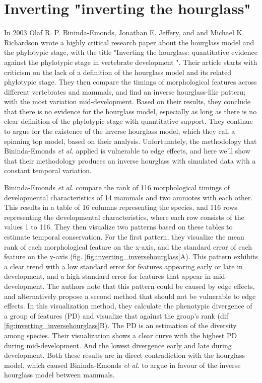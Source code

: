 \chapter{Inverting "inverting the hourglass"}\thumbforchapter
\newpage

In 2003 Olaf R. P. Bininda-Emonds, Jonathan E. Jeffery, and and Michael K. Richardson wrote a highly critical research paper about the hourglass model and the phylotypic stage, with the title "Inverting the hourglass: quantitative evidence against the phylotypic stage in vertebrate development "\cite{OlafRP2003}. Their article starts with criticism on the lack of a definition of the hourglass model and its related phylotypic stage. They then compare the timings of morphological features across different vertebrates and mammals, and find an inverse hourglass-like pattern; with the most variation mid-development. Based on their results, they conclude that there is no evidence for the hourglass model, especially as long as there is no clear definition of the phylotypic stage with quantitative support. They continue to argue for the existence of the inverse hourglass model, which they call a spinning top model, based on their analysis. Unfortunately, the methodology that Bininda-Emonds \textit{et al.} applied is vulnerable to edge effects, and here we'll show that their methodology produces an inverse hourglass with simulated data with a constant temporal variation.

Bininda-Emonds \textit{et al.} compare the rank of 116 morphological timings of developmental characteristics of 14 mammals and two amniotes with each other. This results in a table of 16 columns representing the species, and 116 rows representing the developmental characteristics, where each row consists of the values 1 to 116. They then visualize two patterns based on these tables to estimate temporal conservation. For the first pattern, they visualize the mean rank of each morphological feature on the x-axis, and the standard error of each feature on the y-axis (fig. \ref{fig:inverting_inversehourglass}A). This pattern exhibits a clear trend with a low standard error for features appearing early or late in development, and a high standard error for features that appear in mid-development. The authors note that this pattern could be caused by edge effects, and alternatively propose a second method that should not be vulnerable to edge effects. In this visualization method, they calculate the phenotypic divergence of a group of features (PD) and visualize that against the group's rank (dif \ref{fig:inverting_inversehourglass}B). The PD is an estimation of the diversity among species. Their visualization shows a clear curve with the highest PD during mid-development. And the lowest divergence early and late during development. Both these results are in direct contradiction with the hourglass model, which caused Bininda-Emonds \textit{et al.} to argue in favour of the inverse hourglass model between mammals.

